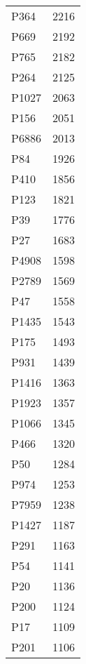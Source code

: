 \begin{tabular}{lr}
    P364 &                         2216 \\
    P669 &                         2192 \\
    P765 &                         2182 \\
    P264 &                         2125 \\
   P1027 &                         2063 \\
    P156 &                         2051 \\
   P6886 &                         2013 \\
     P84 &                         1926 \\
    P410 &                         1856 \\
    P123 &                         1821 \\
     P39 &                         1776 \\
     P27 &                         1683 \\
   P4908 &                         1598 \\
   P2789 &                         1569 \\
     P47 &                         1558 \\
   P1435 &                         1543 \\
    P175 &                         1493 \\
    P931 &                         1439 \\
   P1416 &                         1363 \\
   P1923 &                         1357 \\
   P1066 &                         1345 \\
    P466 &                         1320 \\
     P50 &                         1284 \\
    P974 &                         1253 \\
   P7959 &                         1238 \\
   P1427 &                         1187 \\
    P291 &                         1163 \\
     P54 &                         1141 \\
     P20 &                         1136 \\
    P200 &                         1124 \\
     P17 &                         1109 \\
    P201 &                         1106 \\

\end{tabular}
